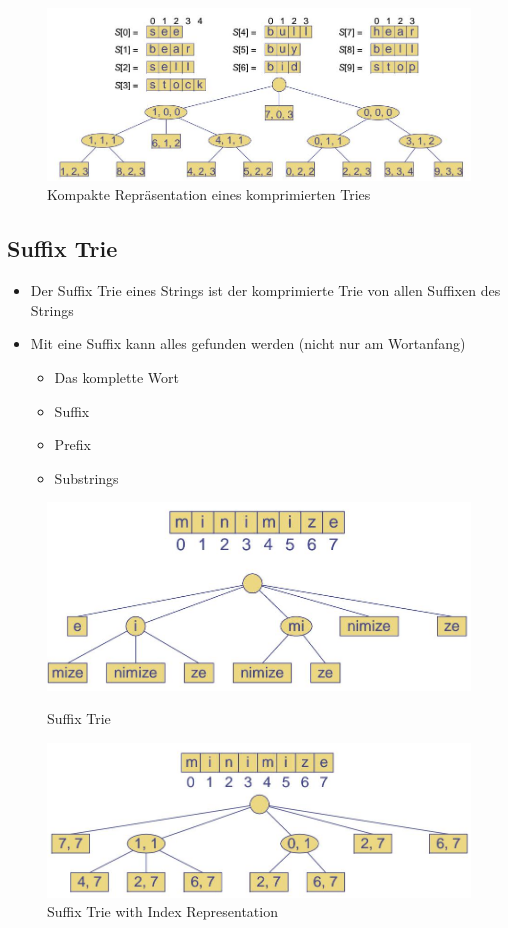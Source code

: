 \begin{figure}[h]
\centering
\includegraphics[width=0.7\linewidth]{images/compressed_trie_representation}
\caption{Kompakte Repräsentation eines komprimierten Tries}
\label{fig:compressedtrierepresentation}
\end{figure}

\subsection{Suffix Trie}
\begin{itemize}
	\item Der Suffix Trie eines Strings ist der komprimierte Trie von allen Suffixen des Strings
	\item Mit eine Suffix kann alles gefunden werden (nicht nur am Wortanfang)
	\begin{itemize}
		\item Das komplette Wort
		\item Suffix
		\item Prefix
		\item Substrings
	\end{itemize}
\end{itemize}
\begin{figure}[ht!]
	\centering
	\begin{minipage}[t]{0.4\textwidth}
		\centering
		\includegraphics[width=0.9\linewidth]{images/suffix_trie}
		\caption{Suffix Trie}
		\label{fig:suffixtrie}
	\end{minipage}
	\begin{minipage}[t]{0.4\textwidth}
		\centering
		\includegraphics[width=0.9\linewidth]{images/suffix_trie_indexes}
		\caption{Suffix Trie with Index Representation}
		\label{fig:suffixtrieindexes}
	\end{minipage}
\end{figure}



